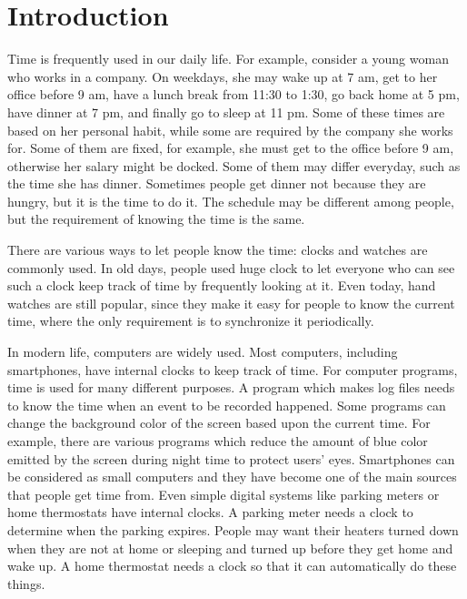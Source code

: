


\chapter{Introduction}
Time is frequently used in our daily life. For example, consider a young
woman who works in a company. On weekdays, she may wake up at 7 am, get to her
office before 9 am, have a lunch break from 11:30 to 1:30, go back home at 5
pm, have dinner at 7 pm, and finally go to sleep at 11 pm. Some of these times
are based on her personal habit, while some are required by the company she
works for.  Some of them are fixed, for example, she must get to the office
before 9 am, otherwise her salary might be docked. Some of them may differ
everyday, such as the time she has dinner. Sometimes people get dinner not
because they are hungry, but it is the time to do it. The schedule may be
different among people, but the requirement of knowing the time is the same.

There are various ways to let people know the time: clocks and watches are
commonly used. In old days, people used huge clock to let everyone who can see
such a clock keep track of time by frequently looking at it. Even today, hand
watches are still popular, since they make it easy for people to know the
current time, where the only requirement is to synchronize it periodically.

In modern life, computers are widely used. Most computers, including
smartphones, have internal clocks to keep track of time. For computer programs, 
time is used for many different purposes. A program which makes log files needs
to know the time when an event to be recorded happened. Some programs can
change the background color of the screen based upon the current time. For
example, there are various programs which reduce the amount of blue color
emitted by the screen during night time to protect users' eyes.  Smartphones
can be considered as small computers and they have become one of the main
sources that people get time from. Even simple digital systems like parking
meters or home thermostats have internal clocks. A parking meter needs a clock
to determine when the parking expires. People may want their heaters turned
down when they are not at home or sleeping and turned up before they get home
and wake up. A home thermostat needs a clock so that it can automatically do
these things.

